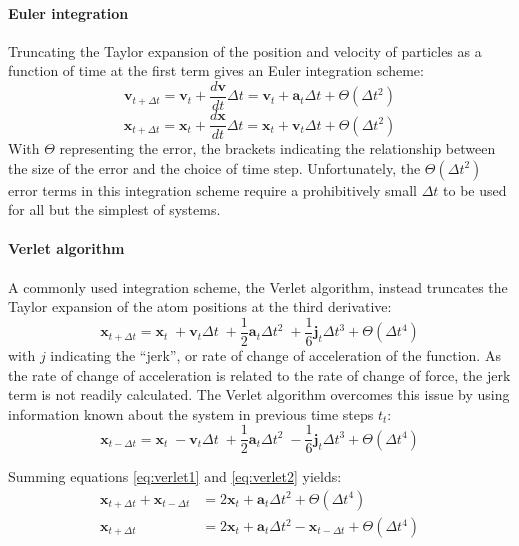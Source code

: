 \paragraph{Euler integration}
Truncating the Taylor expansion of the position and velocity of particles as a function of time at the first term gives an Euler integration scheme:
\begin{equation}
	\mathbf{v}_{t +\Delta t} = \mathbf{v}_t + \frac{d\mathbf{v}}{dt}\Delta t = \mathbf{v}_t + \mathbf{a}_t\Delta t +\Theta(\Delta t^2)
	\end{equation}
\begin{equation}
	\mathbf{x}_{t +\Delta t} = \mathbf{x}_t + \frac{d\mathbf{x}}{dt}\Delta t = \mathbf{x}_t + \mathbf{v}_t\Delta t +\Theta(\Delta t^2)
\end{equation}
With $\Theta$ representing the error, the brackets indicating the relationship between the size of the error and the choice of time step.
Unfortunately, the $\Theta(\Delta t^2)$ error terms in this integration scheme require a prohibitively small $\Delta t$ to be used for all but the simplest of systems. 

\paragraph{Verlet algorithm} A commonly used integration scheme, the Verlet algorithm, instead truncates the Taylor expansion of the atom positions at the third derivative:
\begin{equation}
\mathbf{x}_{t + \Delta t} = \mathbf{x}_{t} \; +  \mathbf{v}_{t}\Delta t \;+ \frac{1}{2}\mathbf{a}_{t}\Delta t^2     \;+ \frac{1}{6}\mathbf{j}_{t}\Delta t^3 + \Theta(\Delta t^4)
\label{eq:verlet1}
\end{equation}
with $j$ indicating the ``jerk'', or rate of change of acceleration of the function.
As the rate of change of acceleration is related to the rate of change of force, the jerk term is not readily calculated.
The Verlet algorithm overcomes this issue by using information known about the system in previous time steps $t_{t}$:
\begin{equation}
\mathbf{x}_{t - \Delta t} = \mathbf{x}_{t} \; -  \mathbf{v}_{t}\Delta t \;+ \frac{1}{2}\mathbf{a}_{t}\Delta t^2     \;- \frac{1}{6}\mathbf{j}_{t}\Delta t^3 + \Theta(\Delta t^4)
\label{eq:verlet2}
\end{equation}

Summing equations \ref{eq:verlet1} and \ref{eq:verlet2} yields:
\begin{align}
\mathbf{x}_{t + \Delta t} + \mathbf{x}_{t - \Delta t} &= 2\mathbf{x}_{t} + \mathbf{a}_{t}\Delta t^2 + \Theta(\Delta t^4)\\
\mathbf{x}_{t + \Delta t} &= 2\mathbf{x}_{t} + \mathbf{a}_{t}\Delta t^2 -  \mathbf{x}_{t - \Delta t} + \Theta(\Delta t^4)
\label{eq:verlet}
\end{align}

